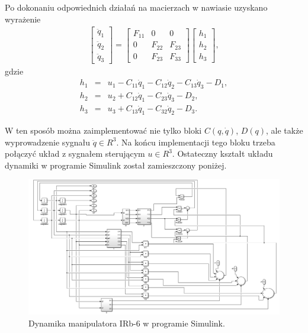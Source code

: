 \documentclass[eng,printmode]{mgr}
\begin{document}
 Po dokonaniu odpowiednich działań na macierzach w nawiasie uzyskano wyrażenie
\begin{eqnarray}
 \left[
        \begin{array}{c}
         \ddot{q}_1\\ 
        \ddot{q}_2\\
         \ddot{q}_3
         \end{array}
      \right]=\left[
        \begin{array}{ccc}
         F_{11} & 0 & 0\\ 
         0 & F_{22}  & F_{23}\\
         0 & F_{23}  & F_{33}
         \end{array}
      \right]\left[
        \begin{array}{c}
         h_1\\ 
        h_2\\
         h_3
         \end{array}
      \right],
     \end{eqnarray}
gdzie\\
\begin{eqnarray}
h_1 &=& u_1 - C_{11}\dot{q}_1 - C_{12}\dot{q}_2 - C_{13}\dot{q}_3 - D_1 ,\nonumber\\
h_2 &=& u_2 + C_{12}\dot{q}_1 - C_{23}\dot{q}_3 - D_2,\nonumber\\
h_3 &=&u_3 + C_{13}\dot{q}_1 - C_{32}\dot{q}_2 - D_3 .
 \end{eqnarray}
 
 
W ten sposób można zaimplementować nie tylko bloki $C(q, \dot{q})$, $D(q)$, ale także wyprowadzenie sygnału $\ddot{q}∈ R^3 $.  
Na końcu implementacji tego bloku trzeba połączyć układ z sygnałem sterującym $u ∈ R^3 $. Ostateczny kształt układu dynamiki w programie Simulink został zamieszczony poniżej.
\begin{figure}[!ht]
\centering
\includegraphics[width=1\textwidth]{02.png}
\caption{\label{fig:blok5}Dynamika manipulatora IRb-6 w programie Simulink.}
\end{figure}
\newpage
\end{document}

